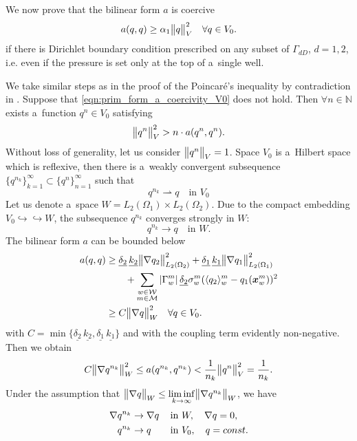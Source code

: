 We now prove that the bilinear form $a$ is coercive
\begin{equation} \label{eqn:prim_form_a_coercivity_V0}
    a(q,q) \geq \alpha_1\bigl\Vert q\bigr\Vert^2_V \quad \forall q\in V_0.
\end{equation}
if there is Dirichlet boundary condition prescribed on any subset of $\Gamma_{dD}$, $d=1,2$,
i.e. even if the pressure is set only at the top of a~single well.

We take similar steps as in the proof of the Poincar{\'e}'s inequality by contradiction in \cite{evans_partial_2010}.
Suppose that \eqref{eqn:prim_form_a_coercivity_V0} does not hold. 
Then $\forall n\in\mathbb N$ exists a~function $q^n\in V_0$ satisfying
\[  \bigl\Vert q^n\bigr\Vert^2_V > n\cdot a(q^n, q^n).
\]
Without loss of generality, let us consider $\bigl\Vert q^n\bigr\Vert_V=1$.
Space $V_0$ is a~Hilbert space which is reflexive, then there is a~weakly convergent subsequence
$\{q^{n_k}\}^{\infty}_{k=1}\subset\{q^{n}\}^{\infty}_{n=1}$ such that
\[  q^{n_k} \rightharpoonup q \quad \textrm{in } V_0
\]
Let us denote a~space $W=L_2(\Omega_1)\times L_2(\Omega_2)$.
Due to the compact embedding $V_0 \hookrightarrow \hookrightarrow W$,
the subsequence $q^{n_k}$ converges strongly in $W$:
\[  q^{n_k} \rightarrow q \quad \textrm{in } W.
\]
The bilinear form $a$ can be bounded below
\begin{align*} 
    a(q,q) &\geq
          \underline{\delta_2}\,\underline{k_2} \bigl\Vert\nabla q_2\bigr\Vert^2_{L_2(\Omega_2)}
        + \underline{\delta_1}\,\underline{k_1} \bigl\Vert\nabla q_1\bigr\Vert^2_{L_2(\Omega_1)} \\
        & \qquad + \sum_{\substack{w\in \mathcal{W} \\ m\in \mathcal{M}}}\left|\Gamma^m_w\right| \underline{\delta_2} \sigma^m_w (\langle q_2\rangle^m_w - q_1(\mathbf{\boldsymbol{x}}^m_w))^2 \\
        &\geq
           C\bigl\Vert\nabla q\bigr\Vert^2_W \quad \forall q\in V_0.
\end{align*}
with $C = \min\{\underline{\delta_2}\,\underline{k_2}, \underline{\delta_1}\,\underline{k_1}\}$
and with the coupling term evidently non-negative.
Then we obtain
\[
    C\bigl\Vert\nabla q^{n_k}\bigr\Vert^2_W \leq a(q^{n_k}, q^{n_k}) < \frac{1}{n_k} \bigl\Vert q^{n}\bigr\Vert^2_V = \frac{1}{n_k}.
\]
Under the assumption that $\bigl\Vert\nabla q\bigr\Vert_W \leq \liminf \limits_{k \rightarrow \infty} \bigl\Vert\nabla q^{n_k}\bigr\Vert_W$,
we have
\begin{align*}
    \nabla q^{n_k} &\rightarrow \nabla q \,\quad \textrm{in } W, \quad \nabla q=0, \\
    q^{n_k} &\rightarrow q \qquad \textrm{in } V_0, \quad q=const.
\end{align*}
